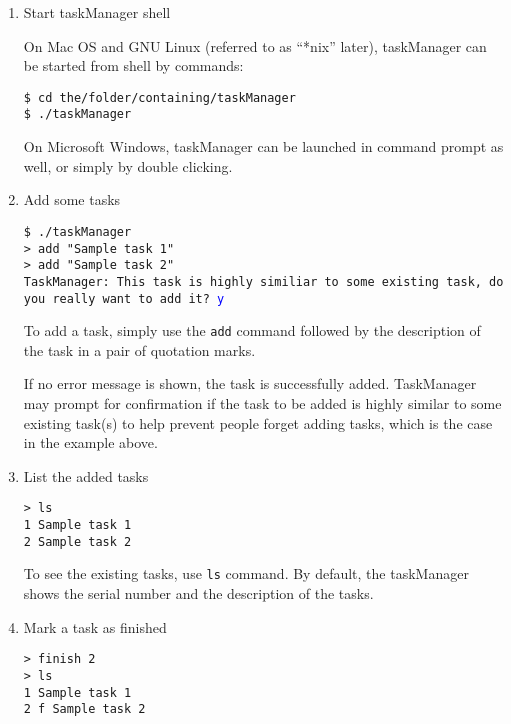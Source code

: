 \documentclass[12pt, a4paper]{article}
\begin{document}
\noindent \begin{enumerate}
\item Start taskManager shell

On Mac OS and GNU Linux (referred to as ``*nix'' later), taskManager can be started from shell by commands:

\texttt{\$ cd the/folder/containing/taskManager\\
  \$ ./taskManager \footnotemark}

On Microsoft Windows, taskManager can be launched in command prompt as well, or simply by double clicking.


\item Add some tasks

\texttt{\$ ./taskManager\\
  \textgreater \  add "Sample task 1"\\
  \textgreater \  add "Sample task 2"\\
  TaskManager: This task is highly similiar to some existing task, do you really want to add it? \textcolor{blue}{y}}

To add a task, simply use the \texttt{add} command followed by the description of the task in a pair of quotation marks. 

If no error message is shown, the task is successfully added.
TaskManager may prompt for confirmation if the task to be added is highly similar to some existing task(s) to help prevent people forget adding tasks, which is the case in the example above.

\item List the added tasks

\texttt{\textgreater \ ls\\
  1   Sample task 1\\
  2   Sample task 2}

To see the existing tasks, use \texttt{ls} command. By default, the taskManager shows the serial number and the description of the tasks.

\item Mark a task as finished

\texttt{\textgreater \ finish 2\\
  \textgreater \ ls\\
  1   Sample task 1\\
  2 f Sample task 2}
 

\end{enumerate}
\end{document}
